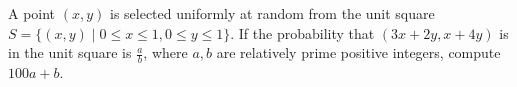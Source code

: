 A point $(x, y)$ is selected uniformly at random from the unit square $S = \{ (x, y) \mid 0 \le x \le 1, 0 \le y \le 1\}$. If the probability that $(3x + 2y, x + 4y)$ is in the unit square is $\frac{a}{b}$, where $a, b$ are relatively prime positive integers, compute $100a + b$.
